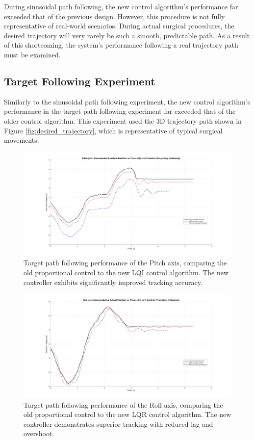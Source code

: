 During sinusoidal path following, the new control algorithm's performance far exceeded that of the previous design. However, this procedure is not fully representative of real-world scenarios. During actual surgical procedures, the desired trajectory will very rarely be such a smooth, predictable path. As a result of this shortcoming, the system's performance following a real trajectory path must be examined.

\subsection{Target Following Experiment}

Similarly to the sinusoidal path following experiment, the new control algorithm's performance in the target path following experiment far exceeded that of the older control algorithm. This experiment used the 3D trajectory path shown in Figure \ref{fig:desired_trajectory}, which is representative of typical surgical movements.

\begin{figure}[h!]
    \centering
    \includegraphics[width=1.00\linewidth]{figures/pitch_traj_combined.jpg}
    \caption{Target path following performance of the Pitch axis, comparing the old proportional control to the new LQI control algorithm. The new controller exhibits significantly improved tracking accuracy.}
    \label{fig:pitch_traj_combined}
\end{figure}

\begin{figure}[h!]
    \centering
    \includegraphics[width=1.00\linewidth]{figures/roll_traj_combined.jpg}
    \caption{Target path following performance of the Roll axis, comparing the old proportional control to the new LQR control algorithm. The new controller demonstrates superior tracking with reduced lag and overshoot.}
    \label{fig:roll_traj_combined}
\end{figure}

